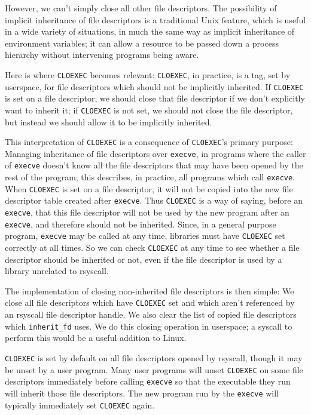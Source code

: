 \documentclass{acmart}
\begin{document}
However, we can't simply close all other file descriptors.
The possibility of implicit inheritance of file descriptors is a traditional Unix feature,
which is useful in a wide variety of situations,
in much the same way as implicit inheritance of environment variables;
it can allow a resource to be passed down a process hierarchy without intervening programs being aware.

Here is where \texttt{CLOEXEC} becomes relevant:
\texttt{CLOEXEC}, in practice,
is a tag, set by userspace, for file descriptors which should not be implicitly inherited.
If \texttt{CLOEXEC} is set on a file descriptor,
we should close that file descriptor if we don't explicitly want to inherit it;
if \texttt{CLOEXEC} is not set, we should not close the file descriptor,
but instead we should allow it to be implicitly inherited.

This interpretation of \texttt{CLOEXEC} is a consequence of \texttt{CLOEXEC}'s primary purpose:
Managing inheritance of file descriptors over \texttt{execve},
in programs where the caller of \texttt{execve}
doesn't know all the file descriptors that may have been opened by the rest of the program;
this describes, in practice, all programs which call \texttt{execve}.
When \texttt{CLOEXEC} is set on a file descriptor,
it will not be copied into the new file descriptor table created after \texttt{execve}.
Thus \texttt{CLOEXEC} is a way of saying, before an \texttt{execve},
that this file descriptor will not be used by the new program after an \texttt{execve},
and therefore should not be inherited.
Since, in a general purpose program, \texttt{execve} may be called at any time,
libraries must have \texttt{CLOEXEC} set correctly at all times.
So we can check \texttt{CLOEXEC} at any time to see whether a file descriptor should be inherited or not,
even if the file descriptor is used by a library unrelated to rsyscall.

The implementation of closing non-inherited file descriptors is then simple:
We close all file descriptors which have \texttt{CLOEXEC} set
and which aren't referenced by an rsyscall file descriptor handle.
We also clear the list of copied file descriptors which \verb|inherit_fd| uses.
We do this closing operation in userspace;
a syscall to perform this would be a useful addition to Linux.

\texttt{CLOEXEC} is set by default on all file descriptors opened by rsyscall,
though it may be unset by a user program.
Many user programs will unset \texttt{CLOEXEC} on some file descriptors immediately before calling \texttt{execve}
so that the executable they run will inherit those file descriptors.
The new program run by the \texttt{execve} will typically immediately set \texttt{CLOEXEC} again.
\end{document}
